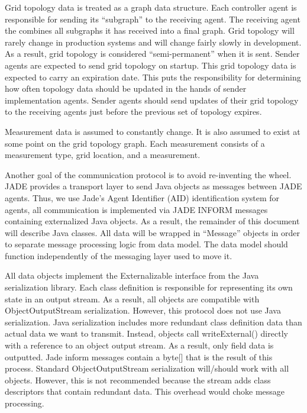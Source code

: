 \documentclass{article}
\begin{document}
Grid topology data is treated as a graph data structure. Each controller agent is responsible for sending its “subgraph” to the receiving agent. The receiving agent the combines all subgraphs it has received into a final graph. Grid topology will rarely change in production systems and will change fairly slowly in development. As a result, grid topology is considered “semi-permanent” when it is sent. Sender agents are expected to send grid topology on startup. This grid topology data is expected to carry an expiration date. This puts the responsibility for determining how often topology data should be updated in the hands of sender implementation agents. Sender agents should send updates of their grid topology to the receiving agents just before the previous set of topology expires.

Measurement data is assumed to constantly change. It is also assumed to exist at some point on the grid topology graph. Each measurement consists of a measurement type, grid location, and a measurement.

Another goal of the communication protocol is to avoid re-inventing the wheel. JADE provides a transport layer to send Java objects as messages between JADE agents. Thus, we use Jade’s Agent Identifier (AID) identification system for agents, all communication is implemented via JADE INFORM messages containing externalized Java objects. As a result, the remainder of this document will describe Java classes. All data will be wrapped in “Message” objects in order to separate message processing logic from data model. The data model should function independently of the messaging layer used to move it.

All data objects implement the Externalizable interface from the Java serialization library. Each class definition is responsible for representing its own state in an output stream. As a result, all objects are compatible with ObjectOutputStream serialization. However, this protocol does not use Java serialization. Java serialization includes more redundant class definition data than actual data we want to transmit. Instead, objects call writeExternal() directly with a reference to an object output stream. As a result, only field data is outputted. Jade inform messages contain a byte[] that is the result of this process. Standard ObjectOutputStream serialization will/should work with all objects. However, this is not recommended because the stream adds class descriptors that contain redundant data. This overhead would choke message processing.
\end{document}
